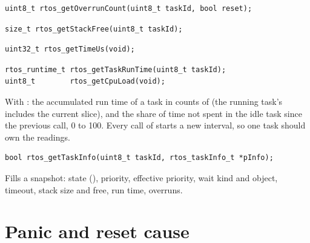 \begin{lstlisting}
uint8_t rtos_getOverrunCount(uint8_t taskId, bool reset);
\end{lstlisting}
 

\begin{lstlisting}
size_t rtos_getStackFree(uint8_t taskId);
\end{lstlisting}

\begin{lstlisting}
uint32_t rtos_getTimeUs(void);
\end{lstlisting}
 

\begin{lstlisting}
rtos_runtime_t rtos_getTaskRunTime(uint8_t taskId);
uint8_t        rtos_getCpuLoad(void);
\end{lstlisting}
With : the accumulated run time of a task in counts of
 (the running task's includes the current slice), and the share
of time not spent in the idle task since the previous call, 0 to 100. Every call of
 starts a new interval, so one task should own the readings.

\begin{lstlisting}
bool rtos_getTaskInfo(uint8_t taskId, rtos_taskInfo_t *pInfo);
\end{lstlisting}
Fills a snapshot: state (), priority, effective priority, wait kind
and object, timeout, stack size and free, run time, overruns.

\section{Panic and reset cause}

